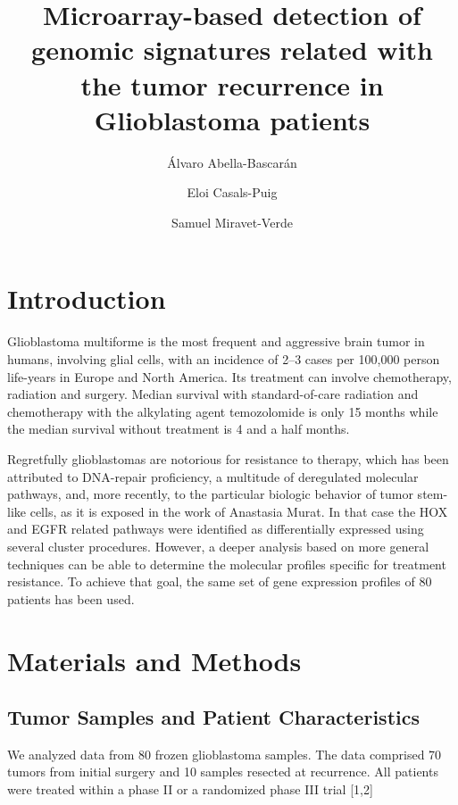 \documentclass[9pt,twocolumn,twoside]{gsajnl}
\title{Microarray-based detection of genomic signatures related with the tumor recurrence in Glioblastoma patients}
\author[$\ast$,1]{Álvaro Abella-Bascarán}
\author[$\ast$]{Eloi Casals-Puig}
\author[$\ast$]{Samuel Miravet-Verde}
\affil[$\ast$]{Pompeu Fabra University, Barcelona (Spain)}
\begin{document}
\maketitle
\thispagestyle{firststyle}
\marginmark
\firstpagefootnote
{}

\vspace{-1cm}
\section*{Introduction}

Glioblastoma multiforme is the most frequent and aggressive brain tumor in humans, involving glial cells, with an incidence of 2–3 cases per 100,000 person life-years in Europe and North America\citep{Bleeker2012}. Its treatment can involve chemotherapy, radiation and surgery. Median survival with standard-of-care radiation and chemotherapy with the alkylating agent temozolomide is only 15 months\citep{Johnson2012} while the median survival without treatment is 4 and a half months. 

Regretfully glioblastomas are notorious for resistance to therapy, which has been attributed to DNA-repair proficiency, a multitude of deregulated molecular pathways, and, more recently, to the particular biologic behavior of tumor stem-like cells, as it is exposed in the work of Anastasia Murat\citep{Murat2008}. In that case the HOX and EGFR related pathways were identified as differentially expressed using several cluster procedures. However, a deeper analysis based on more general techniques can be able to determine the molecular profiles specific for treatment resistance. To achieve that goal, the same set of gene expression profiles of 80 patients has been used. 

\section*{Materials and Methods}

\subsection*{Tumor Samples and Patient Characteristics}

We analyzed data from 80 frozen glioblastoma samples. The data comprised 70 tumors from initial surgery and 10 samples resected at recurrence. All patients were treated within a phase II or a randomized phase III trial [1,2]
\end{document}
